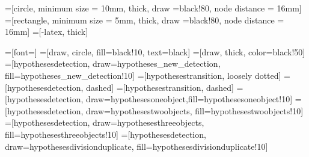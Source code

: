 \usepackage{tikz}
\usetikzlibrary{arrows}
\usetikzlibrary{snakes}
\usetikzlibrary{backgrounds}
\usetikzlibrary{patterns}
\usetikzlibrary{matrix}
\usetikzlibrary{shapes}
\usetikzlibrary{fit}
\usetikzlibrary{calc}
\usetikzlibrary{shadows}
\usetikzlibrary{plotmarks}
\usetikzlibrary{positioning}


=[circle, minimum size = 10mm, thick, draw =black!80, node distance = 16mm]
=[rectangle, minimum size = 5mm, thick, draw =black!80, node distance = 16mm]
=[-latex, thick]



=[font=\huge]
=[draw, circle, fill=black!10, text=black]
=[draw, thick, color=black!50]
=[hypothesesdetection, draw=hypotheses_new_detection, fill=hypotheses_new_detection!10]
=[hypothesestransition, loosely dotted]
=[hypothesesdetection, dashed]
=[hypothesestransition, dashed]
=[hypothesesdetection, draw=hypothesesoneobject,fill=hypothesesoneobject!10]
=[hypothesesdetection, draw=hypothesestwoobjects, fill=hypothesestwoobjects!10]
=[hypothesesdetection, draw=hypothesesthreeobjects, fill=hypothesesthreeobjects!10]
=[hypothesesdetection, draw=hypothesesdivisionduplicate,
fill=hypothesesdivisionduplicate!10]

